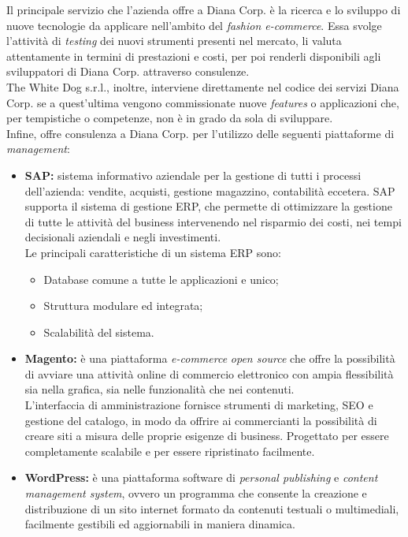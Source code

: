 Il principale servizio che l'azienda offre a Diana Corp. è la ricerca e lo sviluppo di nuove tecnologie da applicare nell'ambito del \textit{fashion e-commerce}. Essa svolge l'attività di \textit{testing} dei nuovi strumenti presenti nel mercato, li valuta attentamente in termini di prestazioni e costi, per poi renderli disponibili agli sviluppatori di Diana Corp. attraverso consulenze. \\
The White Dog s.r.l., inoltre, interviene direttamente nel codice dei servizi Diana Corp. se a quest'ultima vengono commissionate nuove \textit{features} o applicazioni che, per tempistiche o competenze, non è in grado da sola di sviluppare. \\
Infine, offre consulenza a Diana Corp. per l'utilizzo delle seguenti piattaforme di \textit{management}:

\begin{itemize}
	\item \textbf{SAP:} sistema informativo aziendale per la gestione di tutti i processi dell’azienda: vendite, acquisti, gestione magazzino, contabilità eccetera. SAP supporta il sistema di gestione ERP, che permette di ottimizzare la gestione di tutte le attività del business intervenendo nel risparmio dei costi, nei tempi decisionali aziendali e negli investimenti. \\
	Le principali caratteristiche di un sistema ERP sono:
	\begin{itemize}
		\item Database comune a tutte le applicazioni e unico;
		\item Struttura modulare ed integrata;
		\item Scalabilità del sistema.
	\end{itemize}
	
	\item \textbf{Magento:} è una piattaforma \textit{e-commerce} \textit{open source} che offre la possibilità di avviare una attività online di commercio elettronico con ampia flessibilità sia nella grafica, sia nelle funzionalità che nei contenuti. \\
	L’interfaccia di amministrazione fornisce strumenti di marketing, SEO e gestione del catalogo, in modo da offrire ai commercianti la possibilità di creare siti a misura delle proprie esigenze di business. Progettato per essere completamente scalabile e per essere ripristinato facilmente.
	
	\item \textbf{WordPress:} è una piattaforma software di \textit{personal publishing} e \textit{content management system}, ovvero un programma che consente la creazione e distribuzione di un sito internet formato da contenuti testuali o multimediali, facilmente gestibili ed aggiornabili in maniera dinamica.	
\end{itemize}
 
